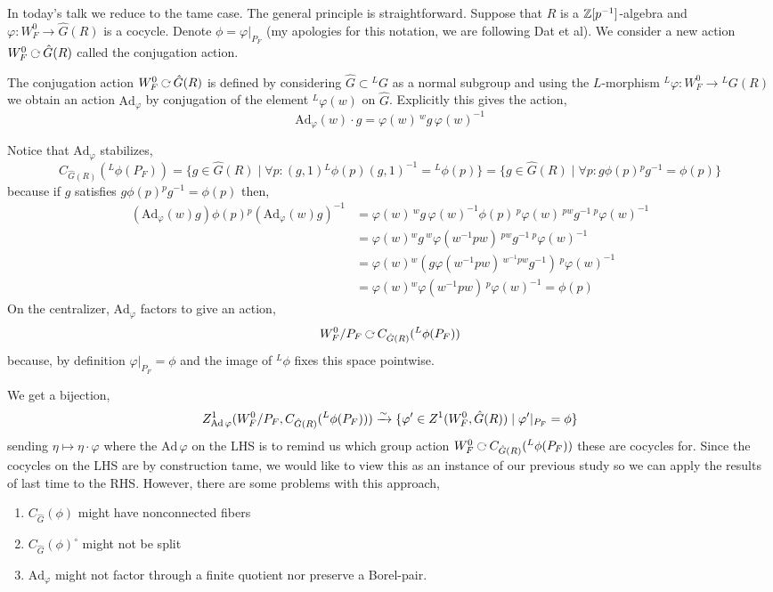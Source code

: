 \documentclass[12pt]{article}
\renewcommand{\Ad}{\mathrm{Ad}}
\begin{document}
In today's talk we reduce to the tame case. The general principle is straightforward. Suppose that $R$ is a $\mathbb{Z}[p^{-1}]$-algebra and $\varphi : W_F^0 \to \hat{G}(R)$ is a cocycle. Denote $\phi = \varphi|_{P_F}$ (my apologies for this notation, we are following Dat et al). We consider a new action $W_F^0 \acts \hat{G}(R)$ called the conjugation action.

\begin{defn}
The conjugation action $W_F^0 \acts \hat{G}(R)$ is defined by considering $\hat{G} \subset {}^L G$ as a normal subgroup and using the $L$-morphism ${}^L \varphi : W_F^0 \to {}^L G(R)$ we obtain an action $\Ad_{\varphi}$ by conjugation of the element ${}^L \varphi(w)$ on $\hat{G}$. Explicitly this gives the action,
\[ \Ad_{\varphi}(w) \cdot g = \varphi(w) \, {}^w g \, \varphi(w)^{-1} \]
\end{defn}
Notice that $\Ad_{\varphi}$ stabilizes,
\[ C_{\hat{G}(R)}({}^L \phi(P_F)) = \{ g \in \hat{G}(R) \mid \forall p : (g,1) {}^L \phi(p) (g,1)^{-1} = {}^L \phi(p) \} = \{ g \in \hat{G}(R) \mid \forall p : g \phi(p) {}^p g^{-1} = \phi(p) \}  \]
because if $g$ satisfies $g \phi(p) {}^p g^{-1} = \phi(p)$ then,
\begin{align*}
(\Ad_{\varphi}(w) g) \phi(p) {}^p (\Ad_{\varphi}(w) g)^{-1} & = \varphi(w) \, {}^w g \, \varphi(w)^{-1} \phi(p) \, {}^p \varphi(w) \, {}^{pw} g^{-1} \, {}^p \varphi(w)^{-1} 
\\
& = \varphi(w) {}^w g \, {}^{w}\varphi(w^{-1} p w) \, {}^{pw} g^{-1} \, {}^p \varphi(w)^{-1}
\\
& = \varphi(w) {}^w (g \varphi(w^{-1} p w) \, {}^{w^{-1} pw} g^{-1}) \, {}^p \varphi(w)^{-1}
\\
& = \varphi(w) {}^w \varphi(w^{-1} p w) \, {}^p \varphi(w)^{-1} = \phi(p)
\end{align*}
On the centralizer, $\Ad_{\varphi}$ factors to give an action,
\[ W_F^0 / P_F \acts C_{\hat{G}(R)}({}^L \phi(P_F)) \]
because, by definition $\varphi|_{P_F} = \phi$ and the image of ${}^L \phi$ fixes this space pointwise.

We get a bijection,
\[ Z^1_{\Ad \, \varphi}(W_F^0/P_F, C_{\hat{G}(R)}({}^L \phi(P_F))) \iso \{ \varphi' \in Z^1(W_F^0, \hat{G}(R)) \mid \varphi'|_{P_F} = \phi \} \]
sending $\eta \mapsto \eta \cdot \varphi$
where the $\Ad \, \varphi$ on the LHS is to remind us which group action $W^0_F \acts C_{\hat{G}(R)}({}^L \phi(P_F))$ these are cocycles for. Since the cocycles on the LHS are by construction tame, we would like to view this as an instance of our previous study so we can apply the results of last time to the RHS. However, there are some problems with this approach,
\begin{enumerate}
\item $C_{\hat{G}}(\phi)$ might have nonconnected fibers
\item $C_{\hat{G}}(\phi)^\circ$ might not be split
\item $\Ad_{\varphi}$ might not factor through a finite quotient nor preserve a Borel-pair.
\end{enumerate}
\end{document}
